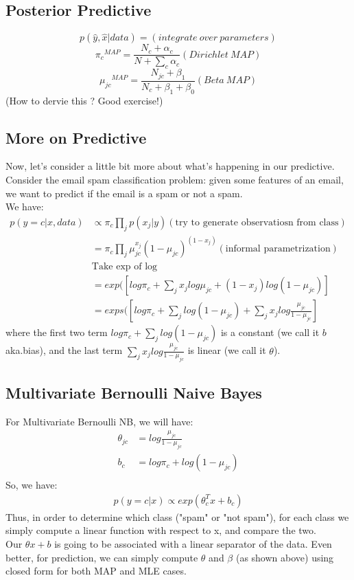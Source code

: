 \documentclass{article}
\begin{document}
\subsection{Posterior Predictive}
\[p(\hat{y}, \hat{x} | data) = (integrate\  over\  parameters) \] 
\[ {\pi_c}^{MAP} = \frac{N_c + \alpha_c}{N + \sum_c \alpha_c} (Dirichlet\  MAP) \] 
\[{\mu_{jc}}^{MAP} = \frac{N_{jc} + \beta_1}{N_c + \beta_1 + \beta_0} (Beta\  MAP)\] 
(How to dervie this ? Good exercise!)
\subsection{More on Predictive}
Now, let's consider a little bit more about what's happening in our predictive.\\
Consider the email spam classification problem: given some features of an email, we want to predict if the email is a spam or not a spam.\\
We have:\\ 
\begin{align}
    p(y = c | x, data) &\propto \pi_c \prod_j p(x_j|y) (\text{try to generate observatiosn from class}) \\
    &= \pi_c \prod_j \mu_{jc}^{x_j} (1-\mu_{jc})^{(1-x_j)} (\text{informal parametrization})\\
    &\text{Take exp of log}\\
    &= exp([log \pi_c + \sum_j x_j log \mu_{jc} + (1-x_j) log(1 - \mu_{jc})]\\
    &= exps([log \pi_c + \sum_j log(1-\mu_{jc}) + \sum_j x_j log\frac{\mu_{jc}}{1-\mu_{jc}}]
\end{align}
where the first two term $log \pi_c + \sum_j log(1-\mu_{jc})$ is a constant (we call it $b$ aka.bias), and the last term $\sum_j x_j log\frac{\mu_{jc}}{1-\mu_{jc}}$ is linear (we call it $\theta$). \\
\subsection{Multivariate Bernoulli Naive Bayes}
For Multivariate Bernoulli NB, we will have: \\ 
\begin{align}
    \theta_{jc} &= log \frac{\mu_{jc}}{1 - \mu_{jc}} \\
    b_c &= log \pi_c + log(1- \mu_{jc})\\
\end{align}
So, we have:
\begin{align}
    p(y=c|x) \propto exp(\theta_c^T x + b_c)
\end{align}
Thus, in order to determine which class ("spam" or "not spam"), for each class we simply compute a linear function with respect to x, and compare the two. \\ 
Our $\theta x + b$ is going to be associated with a linear separator of the data.  Even better, for prediction, we can simply compute $\theta$ and $\beta$ (as shown above) using closed form for both MAP and MLE cases.
\end{document}

